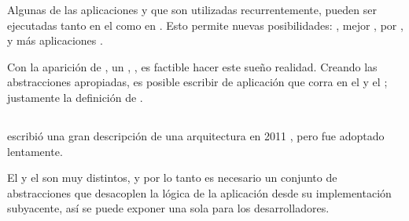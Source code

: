 Algunas de las aplicaciones y \viewLogicAS que son utilizadas recurrentemente, pueden ser ejecutadas tanto en el \serverAS como en \clientAS. Esto permite nuevas posibilidades: \performanceQA \optimizationQA, mejor \maintainabilityQA, \seoINT por , y más  aplicaciones \webINT \statefulINT.

Con la aparición de \nodejsNAME, un \fastQA, \stableQA \serverSideAS \javaScriptNAME \runtimeCPT, es factible hacer este sueño realidad. Creando las abstracciones apropiadas, es posible escribir \logicAS de aplicación que corra en el \serverAS y el \clientAS; justamente la definición de \isomorphicAS \javaScriptNAME.

\subsection{\isomorphicAS \javaScriptNAME \frameworksPC}
\label{cap:justificacion:subsection:isomorphic_javaScript_framework}

\nodejitsuNAME escribió una gran descripción de una arquitectura \isomorphicAS \javaScriptNAME en 2011 \cite{online_nodejitsu_scaling_iso_js_code}, pero fue adoptado lentamente.


El \clientAS y el \serverAS son \environmentsPL muy distintos, y por lo tanto es necesario un conjunto de abstracciones que desacoplen la lógica de la aplicación desde su implementación subyacente, así se puede exponer una sola \apiAS para los desarrolladores.

